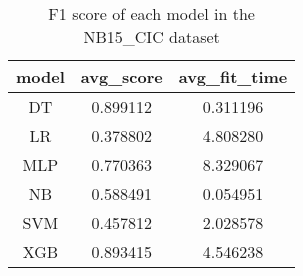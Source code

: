 \begin{table}[H]
\centering
\caption{F1 score of each model in the NB15_CIC dataset}
\label{f1_valid_nb15_cic}
\begin{tabular}{ccc}
\toprule
model &  avg\_score &  avg\_fit\_time \\
\midrule
   DT &   0.899112 &      0.311196 \\
   LR &   0.378802 &      4.808280 \\
  MLP &   0.770363 &      8.329067 \\
   NB &   0.588491 &      0.054951 \\
  SVM &   0.457812 &      2.028578 \\
  XGB &   0.893415 &      4.546238 \\
\bottomrule
\end{tabular}
\end{table}
